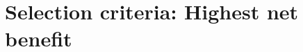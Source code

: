 \documentclass[Main]{subfiles}
\begin{document}
\section{Selection criteria: Highest net benefit}
\end{document}
